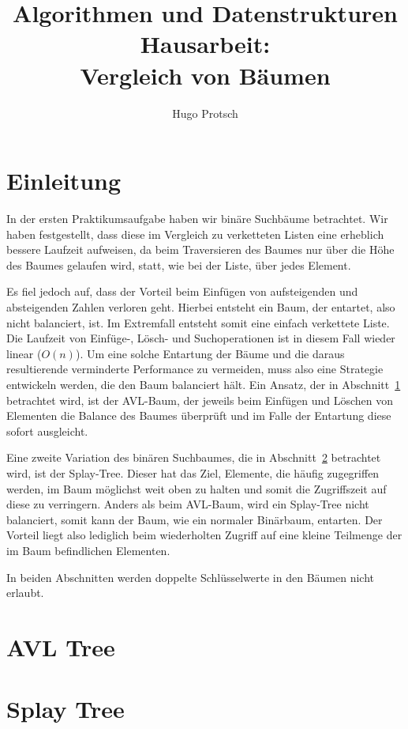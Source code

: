 \documentclass[a4paper]{article}
\title{Algorithmen und Datenstrukturen Hausarbeit:\\Vergleich von Bäumen}
\author{Hugo Protsch}
\begin{document}
    \maketitle
    \tableofcontents
    \newpage
    \section*{Einleitung}\label{sec:Einleitung}

    In der ersten Praktikumsaufgabe haben wir binäre Suchbäume betrachtet.
    Wir haben festgestellt, dass diese im Vergleich zu verketteten Listen eine erheblich
    bessere Laufzeit aufweisen, da beim Traversieren des Baumes nur über die
    Höhe des Baumes gelaufen wird, statt, wie bei der Liste, über jedes Element.

    Es fiel jedoch auf, dass der Vorteil beim Einfügen von aufsteigenden und
    absteigenden Zahlen verloren geht.
    Hierbei entsteht ein Baum, der entartet, also nicht balanciert, ist.
    Im Extremfall entsteht somit eine einfach verkettete Liste.
    Die Laufzeit von Einfüge-, Lösch- und Suchoperationen
    ist in diesem Fall wieder linear (\(O(n)\)).
    Um eine solche Entartung der Bäume und die daraus resultierende verminderte Performance
    zu vermeiden, muss also eine Strategie entwickeln werden, die den Baum balanciert hält.
    Ein Ansatz, der in Abschnitt~\ref{sec:avl-tree} betrachtet wird, ist der AVL-Baum,
    der jeweils beim Einfügen und Löschen von Elementen die
    Balance des Baumes überprüft und im Falle der Entartung diese sofort ausgleicht.

    Eine zweite Variation des binären Suchbaumes, die in Abschnitt~\ref{sec:splay-tree}
    betrachtet wird, ist der Splay-Tree.
    Dieser hat das Ziel, Elemente, die häufig zugegriffen werden, im Baum möglichst weit oben zu
    halten und somit die Zugriffszeit auf diese zu verringern.
    Anders als beim AVL-Baum, wird ein Splay-Tree nicht balanciert, somit kann der Baum, wie ein
    normaler Binärbaum, entarten.
    Der Vorteil liegt also lediglich beim wiederholten Zugriff auf eine kleine Teilmenge der im
    Baum befindlichen Elementen.

    In beiden Abschnitten werden doppelte Schlüsselwerte in den Bäumen nicht
    erlaubt.


    \section{AVL Tree}\label{sec:avl-tree}
    


    \section{Splay Tree}\label{sec:splay-tree}
    
\end{document}
